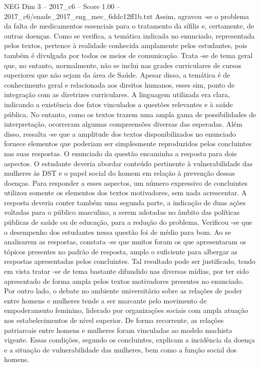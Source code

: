 \begin{textsample}{NEG Dim 3 – 2017\_c6 – Score 1.00 – 2017\_c6/enade\_2017\_eng\_mec\_6ddc12ff1b.txt}
Assim, agravou -se o problema da falta de medicamentos essenciais para o tratamento da sífilis e, certamente, de outras doenças.
Como se verifica, a temática indicada no enunciado, representada pelos textos, pertence à realidade conhecida amplamente pelos estudantes, pois também é divulgada por todos os meios de comunicação.
Trata -se de tema geral que, no entanto, normalmente, não se inclui nas grades curriculares de cursos superiores que não sejam da área de Saúde.
Apesar disso, a temática é de conhecimento geral e relacionada aos direitos humanos, esses sim, ponto de integração com as diretrizes curriculares.
A linguagem utilizada era clara, indicando a existência dos fatos vinculados a questões relevantes e à saúde pública.
No entanto, como os textos trazem uma ampla gama de possibilidades de interpretação, ocorreram algumas compreensões diversas das esperadas.
Além disso, ressalta -se que a amplitude dos textos disponibilizados no enunciado fornece elementos que poderiam ser simplesmente reproduzidos pelos concluintes nas suas respostas.
O enunciado da questão encaminha a resposta para dois aspectos.
O estudante deveria abordar conteúdo pertinente à vulnerabilidade das mulheres às DST e o papel social do homem em relação à prevenção dessas doenças.
Para responder a esses aspectos, um número expressivo de concluintes utilizou somente os elementos dos textos motivadores, sem nada acrescentar.
A resposta deveria conter também uma segunda parte, a indicação de duas ações voltadas para o público masculino, a serem adotadas no âmbito das políticas públicas de saúde ou de educação, para a redução do problema.
Verificou -se que o desempenho dos estudantes nessa questão foi de médio para bom.
Ao se analisarem as respostas, constata -se que muitos foram os que apresentaram os tópicos presentes no padrão de resposta, amplo o suficiente para albergar as respostas apresentadas pelos concluintes.
Tal resultado pode ser justificado, tendo em vista tratar -se de tema bastante difundido nas diversas mídias, por ter sido apresentado de forma ampla pelos textos motivadores presentes no enunciado.
Por outro lado, o debate no ambiente universitário sobre as relações de poder entre homens e mulheres tende a ser marcante pelo movimento de empoderamento feminino, liderado por organizações sociais com ampla atuação nos estabelecimentos de nível superior.
De forma recorrente, as relações patriarcais entre homens e mulheres foram vinculadas ao modelo machista vigente.
Essas condições, segundo os concluintes, explicam a incidência da doença e a situação de vulnerabilidade das mulheres, bem como a função social dos homens.

\end{textsample}
